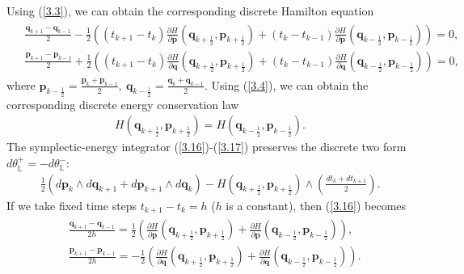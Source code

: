 \documentclass[a4paper,a4paper]{article}
\def\q{\boldsymbol{q}}
\def\p{\boldsymbol{p}}
\begin{document}
Using (\ref{3.3}), we can obtain the corresponding discrete
Hamilton equation \small
\begin{align}
\begin{split}
   &\frac{\q_{k+1}-\q_{k-1}}{2}-\frac{1}{2}\left((t_{k+1}-t_{k})\frac{\partial H}
    {\partial \p}(\q_{k+\frac{1}{2}},
    \p_{k+\frac{1}{2}})+(t_{k}-t_{k-1})\frac{\partial H}{\partial \p}(\q_{k-\frac{1}{2}},
    \p_{k-\frac{1}{2}})\right)=0,\\
  &\frac{\p_{k+1}-\p_{k-1}}{2}+\frac{1}{2}\left((t_{k+1}-t_{k})\frac{\partial H}{\partial \q}
    (\q_{k+\frac{1}{2}},
    \p_{k+\frac{1}{2}})+(t_{k}-t_{k-1})\frac{\partial H}{\partial \q}(\q_{k-\frac{1}{2}},
    \p_{k-\frac{1}{2}})\right)=0,
\end{split}\label{3.16}
\end{align}
\normalsize where $\p_{k-\frac{1}{2}}=\frac{\p_{k}+\p_{k-1}}{2},~
       \q_{k-\frac{1}{2}}=\frac{\q_{k}+\q_{k-1}}{2}$.
Using (\ref{3.4}), we can obtain the corresponding discrete energy conservation
law
\begin{align}
  H(\q_{k+\frac{1}{2}}, \p_{k+\frac{1}{2}})= H(\q_{k-\frac{1}{2}}, \p_{k-\frac{1}{2}}).
  \label{3.17}
\end{align}
The symplectic-energy integrator (\ref{3.16})-(\ref{3.17})
preserves the discrete two form
$d\theta_{\mathbb{L}}^{+}=-d\theta_{\mathbb{L}}^{-}$:
\begin{align}
\frac{1}{2}(d\p_{k}\wedge d\q_{k+1}+d\p_{k+1}\wedge d\q_{k})
  -H(\q_{k+\frac{1}{2}}, \p_{k+\frac{1}{2}})\wedge \left(\frac{dt_{k}+dt_{k+1}}{2}
  \right). \label{3.18}
\end{align}
If we take fixed time steps $t_{k+1}-t_{k}=h$ ($h$ is a constant), then (\ref{3.16})
becomes
\begin{align}
\begin{split}
   &\frac{\q_{k+1}-\q_{k-1}}{2h}=\frac{1}{2}\left(\frac{\partial H}{\partial \p}
        (\q_{k+\frac{1}{2}},
    \p_{k+\frac{1}{2}})+\frac{\partial H}{\partial \p}(\q_{k-\frac{1}{2}},
    \p_{k-\frac{1}{2}})\right),\\
  &\frac{\p_{k+1}-\p_{k-1}}{2h}=-\frac{1}{2}\left(\frac{\partial H}{\partial \q}
  (\q_{k+\frac{1}{2}},
    \p_{k+\frac{1}{2}})+\frac{\partial H}{\partial \q}(\q_{k-\frac{1}{2}},
    \p_{k-\frac{1}{2}})\right).
\end{split}\label{3.19}
\end{align}
\end{document}
